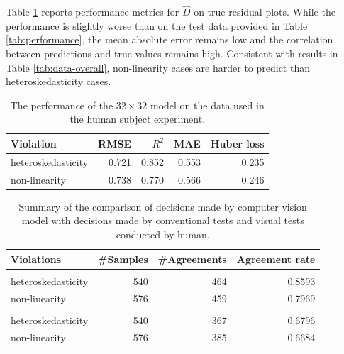 \documentclass[]{interact}
\theoremstyle{plain}%
\theoremstyle{definition}
\theoremstyle{remark}
\begin{document}
Table \ref{tab:experiment-performance} reports performance metrics for
\(\hat{D}\) on true residual plots. While the performance is slightly
worse than on the test data provided in Table \ref{tab:performance}, the
mean absolute error remains low and the correlation between predictions
and true values remains high. Consistent with results in Table
\ref{tab:data-overall}, non-linearity cases are harder to predict than
heteroskedasticity cases.

\begin{table}

\caption{\label{tab:experiment-performance}The performance of the $32 \times 32$ model on the data used in the human subject experiment.}
\centering
\begin{tabular}[t]{lrrrr}
\toprule
Violation & RMSE & $R^2$ & MAE & Huber loss\\
\midrule
heteroskedasticity & 0.721 & 0.852 & 0.553 & 0.235\\
non-linearity & 0.738 & 0.770 & 0.566 & 0.246\\
\bottomrule
\end{tabular}
\end{table}

\begin{table}

\caption{\label{tab:human-conv-table}Summary of the comparison of decisions made by computer vision model with decisions made by conventional tests and visual tests conducted by human.}
\centering
\begin{tabular}[t]{lrrr}
\toprule
Violations & \#Samples & \#Agreements & Agreement rate\\
\midrule
\addlinespace[0.3em]
\multicolumn{4}{l}{\textbf{Compared with conventional tests}}\\
\hspace{1em}heteroskedasticity & 540 & 464 & 0.8593\\
\hspace{1em}non-linearity & 576 & 459 & 0.7969\\
\addlinespace[0.3em]
\multicolumn{4}{l}{\textbf{Compared with visual tests conducted by human}}\\
\hspace{1em}heteroskedasticity & 540 & 367 & 0.6796\\
\hspace{1em}non-linearity & 576 & 385 & 0.6684\\
\bottomrule
\end{tabular}
\end{table}
\end{document}
